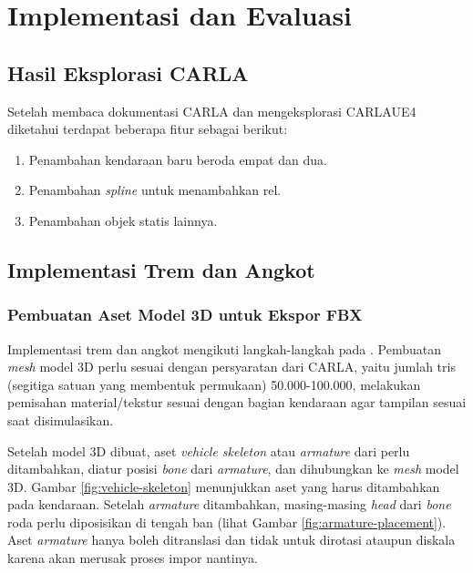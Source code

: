 \chapter{Implementasi dan Evaluasi}

\section{Hasil Eksplorasi CARLA}

Setelah membaca dokumentasi CARLA dan mengeksplorasi CARLAUE4 diketahui terdapat
beberapa fitur sebagai berikut:

\begin{enumerate}
	\item Penambahan kendaraan baru beroda empat dan dua.
	\item Penambahan \textit{spline} untuk menambahkan rel.
	\item Penambahan objek statis lainnya.
\end{enumerate}



\section{Implementasi Trem dan Angkot}

\subsection{Pembuatan Aset Model 3D untuk Ekspor FBX}

Implementasi trem dan angkot mengikuti langkah-langkah pada
\cite{blender-add-a-new-vehicle}. Pembuatan \textit{mesh} model 3D perlu sesuai
dengan persyaratan dari CARLA, yaitu jumlah tris (segitiga satuan yang membentuk
permukaan) 50.000-100.000, melakukan pemisahan material/tekstur sesuai dengan
bagian kendaraan agar tampilan sesuai saat disimulasikan.

Setelah model 3D dibuat, aset \textit{vehicle skeleton} atau \textit{armature}
dari \cite{blender-add-a-new-vehicle} perlu ditambahkan, diatur posisi
\textit{bone} dari \textit{armature}, dan dihubungkan ke \textit{mesh} model 3D.
Gambar \ref{fig:vehicle-skeleton} menunjukkan aset yang harus ditambahkan pada
kendaraan. Setelah \textit{armature} ditambahkan, masing-masing \textit{head}
dari \textit{bone} roda perlu diposisikan di tengah ban (lihat Gambar
\ref{fig:armature-placement}). Aset \textit{armature} hanya boleh ditranslasi
dan tidak untuk dirotasi ataupun diskala karena akan merusak proses impor
nantinya.

